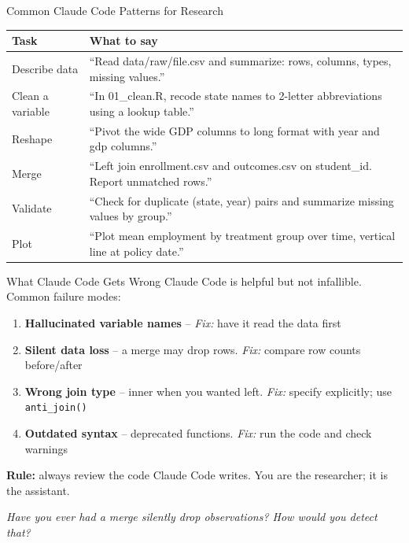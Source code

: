 \begin{frame}{Common Claude Code Patterns for Research}
  \footnotesize
  \begin{tabular}{@{}l>{\raggedright\arraybackslash}p{8cm}@{}}
    \toprule
    \textbf{Task} & \textbf{What to say} \\
    \midrule
    Describe data &
      ``Read data/raw/file.csv and summarize: rows, columns, types, missing values.'' \\[2pt]
    Clean a variable &
      ``In 01\_clean.R, recode state names to 2-letter abbreviations using a lookup table.'' \\[2pt]
    Reshape &
      ``Pivot the wide GDP columns to long format with year and gdp columns.'' \\[2pt]
    Merge &
      ``Left join enrollment.csv and outcomes.csv on student\_id. Report unmatched rows.'' \\[2pt]
    Validate &
      ``Check for duplicate (state, year) pairs and summarize missing values by group.'' \\[2pt]
    Plot &
      ``Plot mean employment by treatment group over time, vertical line at policy date.'' \\
    \bottomrule
  \end{tabular}
\end{frame}

\begin{frame}{What Claude Code Gets Wrong}
  \small
  Claude Code is helpful but not infallible. Common failure modes:

  \vspace{2pt}

  \begin{enumerate}
    \item \textbf{Hallucinated variable names} -- \textit{Fix:} have it read the data first
    \item \textbf{Silent data loss} -- a merge may drop rows. \textit{Fix:} compare row counts before/after
    \item \textbf{Wrong join type} -- inner when you wanted left. \textit{Fix:} specify explicitly; use \texttt{anti\_join()}
    \item \textbf{Outdated syntax} -- deprecated functions. \textit{Fix:} run the code and check warnings
  \end{enumerate}

  \vspace{4pt}

  \normalsize
  \textbf{\textcolor{usfgreen}{Rule:}} always review the code Claude Code writes. You are the researcher; it is the assistant.

  \vspace{2pt}

  \textit{Have you ever had a merge silently drop observations? How would you detect that?}
\end{frame}

